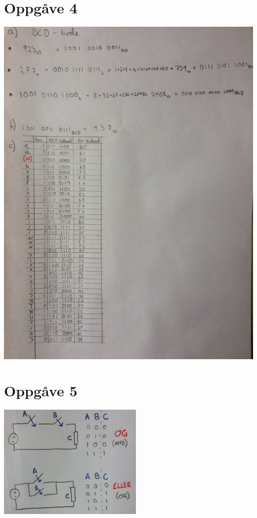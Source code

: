 \documentclass[12pt,a4paper]{article}
\begin{document}
	\section{Oppgåve 4}
		\includegraphics[width=\textwidth]{01_4.png}

	\section{Oppgåve 5}
		\includegraphics[width=200pt]{01_5.png}{\centering}
\end{document}
